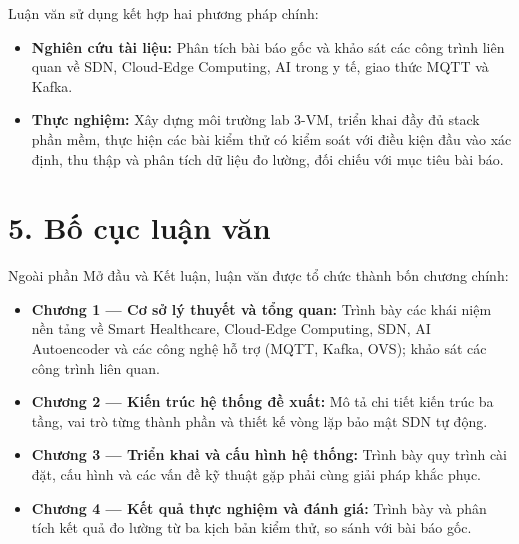 Luận văn sử dụng kết hợp hai phương pháp chính:

\begin{itemize}
    \item \textbf{Nghiên cứu tài liệu:} Phân tích bài báo gốc và khảo sát các công trình liên quan về SDN, Cloud-Edge Computing, AI trong y tế, giao thức MQTT và Kafka.
    \item \textbf{Thực nghiệm:} Xây dựng môi trường lab 3-VM, triển khai đầy đủ stack phần mềm, thực hiện các bài kiểm thử có kiểm soát với điều kiện đầu vào xác định, thu thập và phân tích dữ liệu đo lường, đối chiếu với mục tiêu bài báo.
\end{itemize}

\section*{5. Bố cục luận văn}

Ngoài phần Mở đầu và Kết luận, luận văn được tổ chức thành bốn chương chính:

\begin{itemize}
    \item \textbf{Chương 1 — Cơ sở lý thuyết và tổng quan:} Trình bày các khái niệm nền tảng về Smart Healthcare, Cloud-Edge Computing, SDN, AI Autoencoder và các công nghệ hỗ trợ (MQTT, Kafka, OVS); khảo sát các công trình liên quan.
    \item \textbf{Chương 2 — Kiến trúc hệ thống đề xuất:} Mô tả chi tiết kiến trúc ba tầng, vai trò từng thành phần và thiết kế vòng lặp bảo mật SDN tự động.
    \item \textbf{Chương 3 — Triển khai và cấu hình hệ thống:} Trình bày quy trình cài đặt, cấu hình và các vấn đề kỹ thuật gặp phải cùng giải pháp khắc phục.
    \item \textbf{Chương 4 — Kết quả thực nghiệm và đánh giá:} Trình bày và phân tích kết quả đo lường từ ba kịch bản kiểm thử, so sánh với bài báo gốc.
\end{itemize}
\newpage
